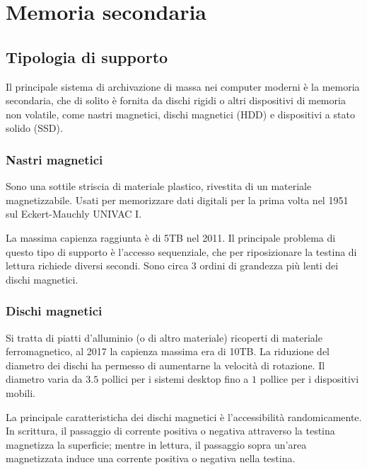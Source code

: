 \documentclass[a4paper,12pt, twoside]{report}
\begin{document}
\chapter{Memoria secondaria}

\section{Tipologia di supporto}

Il principale sistema di archivazione di massa nei computer moderni \`e la memoria secondaria, che di
solito \`e fornita da dischi rigidi o altri dispositivi di memoria non volatile, come nastri magnetici, 
dischi magnetici (HDD) e dispositivi a stato solido (SSD).

\subsection{Nastri magnetici}

Sono una sottile striscia di materiale plastico, rivestita di un materiale magnetizzabile. Usati per 
memorizzare dati digitali per la prima volta nel 1951 sul Eckert-Mauchly UNIVAC I.

La massima capienza raggiunta \`e di 5TB nel 2011. Il principale problema di questo tipo di supporto 
\`e l'accesso sequenziale, che per riposizionare la testina di lettura richiede diversi secondi. Sono
circa 3 ordini di grandezza pi\`u lenti dei dischi magnetici.

\subsection{Dischi magnetici}

Si tratta di piatti d'alluminio (o di altro materiale) ricoperti di materiale ferromagnetico, al 2017 la
capienza massima era di 10TB. La riduzione del diametro dei dischi ha permesso di aumentarne la velocit\`a
di rotazione. Il diametro varia da $3.5$ pollici per i sistemi desktop fino a $1$ pollice per i dispositivi
mobili. 

La principale caratteristicha dei dischi magnetici \`e l'accessibilit\`a randomicamente. In scrittura, il passaggio
di corrente positiva o negativa attraverso la testina magnetizza la superficie; mentre in lettura, il passaggio
sopra un'area magnetizzata induce una corrente positiva o negativa nella testina. 
\end{document}
